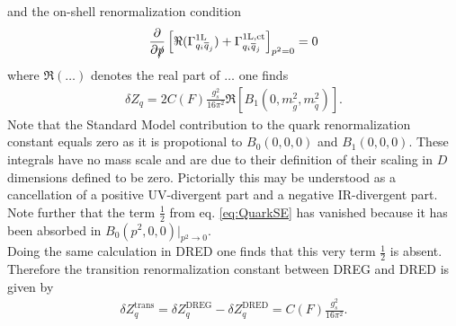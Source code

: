 and the on-shell renormalization condition
\begin{align}
\frac{\partial}{\partial \slashed{p}} \left[ \Re (\Gamma^{\mathrm{1L}}_{q_i\overline{q}_j}) + \Gamma^{\mathrm{1L,ct}}_{q_i\overline{q}_j}  \right]_{p^2 = 0} = 0
\end{align}
where $\Re (\hdots)$ denotes the real part of $\hdots$ one finds
\begin{align}
\delta Z_q = 2 C(F) \frac{g_s^2}{16\pi^2} \Re \left[ B_1(0 ,m_{\tilde{g}}^2,m_{\tilde{q}}^2) \right].
\end{align}
Note that the Standard Model contribution to the quark renormalization constant equals zero as it is propotional to $B_0(0,0,0)$ and $B_1(0,0,0)$. These integrals have no mass scale and are due to their definition of their scaling in $D$ dimensions\cite{Collins:105730} defined to be zero. Pictorially this may be understood as a cancellation of a positive UV-divergent part and a negative IR-divergent part. Note further that the term $\frac{1}{2}$ from eq. \ref{eq:QuarkSE} has vanished because it has been absorbed in $B_0(p^2,0,0)|_{p^2 \to 0}$.\\
Doing the same calculation in DRED one finds that this very term $\frac{1}{2}$ is absent. Therefore the transition renormalization constant between DREG and DRED is given by
\begin{align}
\delta Z_q^{\mathrm{trans}} = \delta Z_q^{\mathrm{DREG}} - \delta Z_q^{\mathrm{DRED}} = C(F) \frac{g_s^2}{16\pi^2}.\label{eq:QuarkSC}
\end{align}

